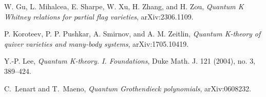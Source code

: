 \documentclass[12pt]{amsart}
\theoremstyle{remark}
\begin{document}
\begin{thebibliography}{12}
 W. Gu, L. Mihalcea, E. Sharpe, W. Xu, H. Zhang, and H. Zou, {\em Quantum K Whitney relations for partial flag varieties}, arXiv:2306.1109.

 P. Koroteev, P. P. Pushkar, A. Smirnov, and A. M. Zeitlin, {\em Quantum K-theory of quiver varieties and many-body systems}, arXiv:1705.10419. 

 Y.-P. Lee, {\em Quantum K-theory. I. Foundations}, Duke Math. J. 121 (2004), no. 3, 389--424. 

 C.~Lenart and T.~Maeno, {\em Quantum Grothendieck polynomials}, arXiv:0608232.



\end{thebibliography}
\end{document}
